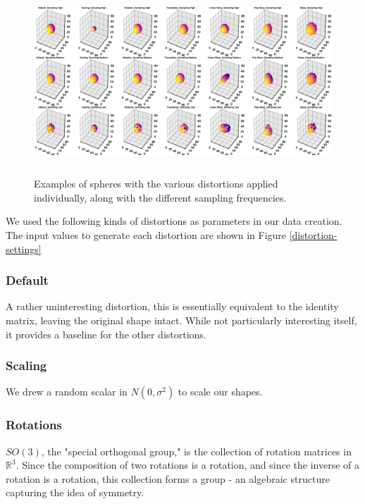 \documentclass{article}
\begin{document}
\begin{figure}%
\vskip 0.2in
\begin{center}
\centerline{\includegraphics[height=7cm]{graphics/shape_exemplars_sp}}
\caption{Examples of spheres with the various distortions applied individually, along with the different sampling frequencies.}
\label{shape_exemplars_sp}
\end{center}
\vskip -0.2in
\end{figure}

We used the following kinds of distortions as parameters in our data creation. The input values to generate each distortion are shown in Figure \ref{distortion-settings}

\subsubsection{Default}

A rather uninteresting distortion, this is essentially equivalent to the identity matrix, leaving the original shape intact.
While not particularly interesting itself, it provides a baseline for the other distortions.

\subsubsection{Scaling}

We drew a random scalar in $N(0,\sigma^2)$ to scale our shapes.

\subsubsection{Rotations}

$SO(3)$, the "special orthogonal group," is the collection of rotation matrices in $\mathbb{R}^3$.
Since the composition of two rotations is a rotation, and since the inverse of a rotation is a rotation,
this collection forms a group - an algebraic structure capturing the idea of symmetry.
\end{document}
